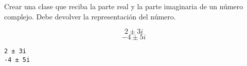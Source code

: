 \begin{exercise}{\rm 
Crear una clase que reciba la parte real y la parte imaginaria de un
número complejo. Debe devolver la representación del número.

\[ 2 \pm 3i\] \[ -4 \pm 5i \]

\begin{Shaded}
\begin{Highlighting}[]
     \NormalTok{(}
        \OperatorTok{=}
        \OperatorTok{=}

     \NormalTok{(}\NormalTok{):}
         \SpecialCharTok{\{}\SpecialCharTok{\}}\SpecialCharTok{\{}\SpecialCharTok{\}}

\OperatorTok{=}\NormalTok{,}\NormalTok{)}
\OperatorTok{=}\OperatorTok{{-}}\NormalTok{,}\NormalTok{)}
\end{Highlighting}
\end{Shaded}

\begin{verbatim}
2 ± 3i
-4 ± 5i

\end{verbatim}
}\end{exercise}


